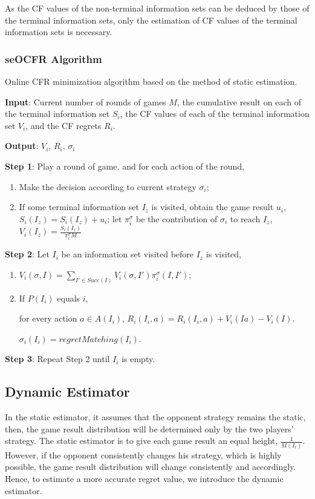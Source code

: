 \documentclass{article}
\begin{document}
As the CF values of the non-terminal information sets can be deduced by those of the terminal information sets, only the estimation of CF values of the terminal information sets is necessary.

\subsubsection{seOCFR Algorithm}

Online CFR minimization algorithm based on the method of static estimation.

\textbf{Input}: Current number of rounds of games $M$, the cumulative result on each of the terminal information set $S_i$, the CF values of each of the terminal information set $V_i$, and the CF regrets $R_i$.

\textbf{Output}: $V_i$, $R_i$, $\sigma_i$

\textbf{Step 1}: Play a round of game, and for each action of the round,
\begin{enumerate}
\item Make the decision according to current strategy $\sigma_i$;
\item If some terminal information set $I_z$ is visited, obtain the game result $u_i$, $S_i(I_z) = S_i(I_z) + u_i$; let $\pi_i^\sigma$ be the contribution of $\sigma_i$ to reach $I_z$, $V_i(I_z) = \frac {S_i(I_z)} {\pi_i^\sigma M}$
\end{enumerate}

\textbf{Step 2}: Let $I_i$ be an information set visited before $I_z$ is visited,

\begin{enumerate}
\item $V_i(\sigma, I) = \sum_{I' \in Succ(I)} V_i(\sigma, I') \pi_i^\sigma(I, I')$;
\item If $P(I_i)$ equals $i$,

for every action $a \in A(I_i)$, $R_i(I_i, a) = R_i(I_i, a) + V_i(I a) - V_i(I)$.

$\sigma_i(I_i) = regretMatching(I_i)$.
\end{enumerate}

\textbf{Step 3}: Repeat Step 2 until $I_i$ is empty.

\subsection{Dynamic Estimator}

In the static estimator, it assumes that the opponent strategy remains the static, then, the game result distribution will be determined only by the two players' strategy. The static estimator is to give each game result an equal height, $\frac {1} {M(I_r)}$. However, if the opponent consistently changes his strategy, which is highly possible, the game result distribution will change consistently and accordingly. Hence, to estimate a more accurate regret value, we introduce the dynamic estimator.
\end{document}
